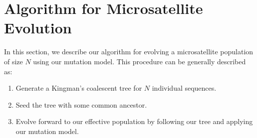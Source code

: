 \section{Algorithm for Microsatellite Evolution}\label{sec:afme}
In this section, we describe our algorithm for evolving a microsatellite population of size $N$ using our mutation
model.
This procedure can be generally described as:
\begin{enumerate}
    \item Generate a Kingman's coalescent tree for $N$ individual sequences.
    \item Seed the tree with some common ancestor.
    \item Evolve forward to our effective population by following our tree and applying our mutation model.
\end{enumerate}

